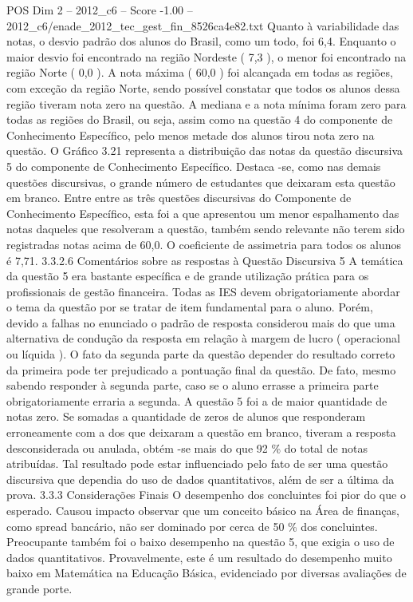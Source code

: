 \begin{textsample}{POS Dim 2 – 2012\_c6 – Score -1.00 – 2012\_c6/enade\_2012\_tec\_gest\_fin\_8526ca4e82.txt}
Quanto à variabilidade das notas, o desvio padrão dos alunos do Brasil, como um todo, foi 6,4.
Enquanto o maior desvio foi encontrado na região Nordeste ( 7,3 ), o menor foi encontrado na região Norte ( 0,0 ).
A nota máxima ( 60,0 ) foi alcançada em todas as regiões, com exceção da região Norte, sendo possível constatar que todos os alunos dessa região tiveram nota zero na questão.
A mediana e a nota mínima foram zero para todas as regiões do Brasil, ou seja, assim como na questão 4 do componente de Conhecimento Específico, pelo menos metade dos alunos tirou nota zero na questão.
O Gráfico 3.21 representa a distribuição das notas da questão discursiva 5 do componente de Conhecimento Específico.
Destaca -se, como nas demais questões discursivas, o grande número de estudantes que deixaram esta questão em branco.
Entre entre as três questões discursivas do Componente de Conhecimento Específico, esta foi a que apresentou um menor espalhamento das notas daqueles que resolveram a questão, também sendo relevante não terem sido registradas notas acima de 60,0.
O coeficiente de assimetria para todos os alunos é 7,71. 3.3.2.6 Comentários sobre as respostas à Questão Discursiva 5 A temática da questão 5 era bastante específica e de grande utilização prática para os profissionais de gestão financeira.
Todas as IES devem obrigatoriamente abordar o tema da questão por se tratar de item fundamental para o aluno.
Porém, devido a falhas no enunciado o padrão de resposta considerou mais do que uma alternativa de condução da resposta em relação à margem de lucro ( operacional ou líquida ).
O fato da segunda parte da questão depender do resultado correto da primeira pode ter prejudicado a pontuação final da questão.
De fato, mesmo sabendo responder à segunda parte, caso se o aluno errasse a primeira parte obrigatoriamente erraria a segunda.
A questão 5 foi a de maior quantidade de notas zero.
Se somadas a quantidade de zeros de alunos que responderam erroneamente com a dos que deixaram a questão em branco, tiveram a resposta desconsiderada ou anulada, obtém -se mais do que 92 \% do total de notas atribuídas.
Tal resultado pode estar influenciado pelo fato de ser uma questão discursiva que dependia do uso de dados quantitativos, além de ser a última da prova. 3.3.3 Considerações Finais O desempenho dos concluintes foi pior do que o esperado.
Causou impacto observar que um conceito básico na Área de finanças, como spread bancário, não ser dominado por cerca de 50 \% dos concluintes.
Preocupante também foi o baixo desempenho na questão 5, que exigia o uso de dados quantitativos.
Provavelmente, este é um resultado do desempenho muito baixo em Matemática na Educação Básica, evidenciado por diversas avaliações de grande porte.

\end{textsample}
